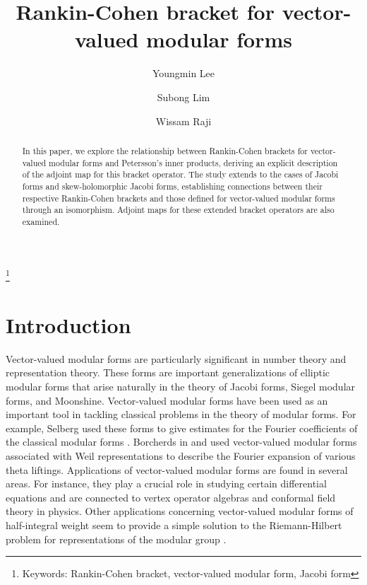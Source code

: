 \documentclass[11pt]{amsart}
\theoremstyle{definition}
\theoremstyle{remark}
\numberwithin{equation}{section}
\renewcommand{\(}{\left(}
\renewcommand{\)}{\right)}
\begin{document}
\title{Rankin-Cohen bracket for vector-valued modular forms}


\author{Youngmin Lee}
\address{School of Mathematics, Korea Institute for Advanced Study, 85 Hoegiro, Dongdaemun-gu,
Seoul 02455, Republic of Korea}
 \author{Subong Lim}
   \address{Department of Mathematics Education, Sungkyunkwan University, Jongno-gu, Seoul 110-745, Republic of Korea}
   \author{Wissam Raji}
   \address{Department of Mathematics, American University of Beirut (AUB) and the Number Theory Research Unit at the Center for Advanced Mathematical Sciences (CAMS) at AUB, Beirut, Lebanon}






\thanks{Keywords: Rankin-Cohen bracket, vector-valued modular form, Jacobi form}

\begin{abstract}
In this paper, we explore the relationship between Rankin-Cohen brackets for vector-valued modular forms and Petersson’s inner products, deriving an explicit description of the adjoint map for this bracket operator. The study extends to the cases of Jacobi forms and skew-holomorphic Jacobi forms, establishing connections between their respective Rankin-Cohen brackets and those defined for vector-valued modular forms through an isomorphism. Adjoint maps for these extended bracket operators are also examined.
\end{abstract}
\maketitle
\section{Introduction} Vector-valued modular forms are particularly significant in number theory and representation theory. These forms are important generalizations of elliptic modular forms that arise naturally in the theory of Jacobi forms, Siegel modular forms, and Moonshine.  Vector-valued modular forms have been used as an important tool in tackling classical problems in the theory of modular forms.  For example, Selberg used these forms to give estimates for the Fourier coefficients of the classical modular forms \cite{S}. Borcherds in \cite{B1} and \cite{B2} used vector-valued modular forms associated with Weil representations to describe the Fourier expansion of various theta liftings.  Applications of vector-valued modular forms are found in several areas. For instance, they play a crucial role in studying certain differential equations and are connected to vertex operator algebras and conformal field theory in physics. Other applications concerning vector-valued modular forms of half-integral weight seem to provide a simple solution to the Riemann-Hilbert problem for representations of the modular group \cite{BG}.
\end{document}
